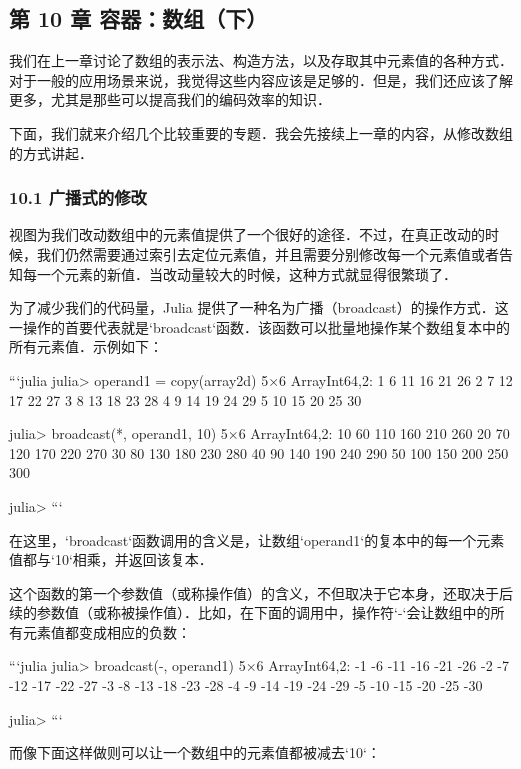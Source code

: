 
\subsection{第 10 章 容器：数组（下）}

我们在上一章讨论了数组的表示法、构造方法，以及存取其中元素值的各种方式．对于一般的应用场景来说，我觉得这些内容应该是足够的．但是，我们还应该了解更多，尤其是那些可以提高我们的编码效率的知识．

下面，我们就来介绍几个比较重要的专题．我会先接续上一章的内容，从修改数组的方式讲起．

\subsubsection{10.1 广播式的修改}

视图为我们改动数组中的元素值提供了一个很好的途径．不过，在真正改动的时候，我们仍然需要通过索引去定位元素值，并且需要分别修改每一个元素值或者告知每一个元素的新值．当改动量较大的时候，这种方式就显得很繁琐了．

为了减少我们的代码量，Julia 提供了一种名为广播（broadcast）的操作方式．这一操作的首要代表就是`broadcast`函数．该函数可以批量地操作某个数组复本中的所有元素值．示例如下：

```julia
julia> operand1 = copy(array2d)
5×6 Array{Int64,2}:
 1   6  11  16  21  26
 2   7  12  17  22  27
 3   8  13  18  23  28
 4   9  14  19  24  29
 5  10  15  20  25  30

julia> broadcast(*, operand1, 10)
5×6 Array{Int64,2}:
 10   60  110  160  210  260
 20   70  120  170  220  270
 30   80  130  180  230  280
 40   90  140  190  240  290
 50  100  150  200  250  300

julia> 
```

在这里，`broadcast`函数调用的含义是，让数组`operand1`的复本中的每一个元素值都与`10`相乘，并返回该复本．

这个函数的第一个参数值（或称操作值）的含义，不但取决于它本身，还取决于后续的参数值（或称被操作值）．比如，在下面的调用中，操作符`-`会让数组中的所有元素值都变成相应的负数：

```julia
julia> broadcast(-, operand1)
5×6 Array{Int64,2}:
 -1   -6  -11  -16  -21  -26
 -2   -7  -12  -17  -22  -27
 -3   -8  -13  -18  -23  -28
 -4   -9  -14  -19  -24  -29
 -5  -10  -15  -20  -25  -30

julia> 
```

而像下面这样做则可以让一个数组中的元素值都被减去`10`：

